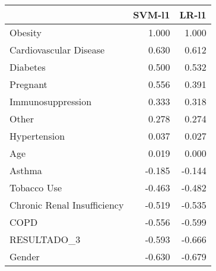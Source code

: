 \begin{tabular}{lrr}
\toprule
{} &  SVM-l1 &  LR-l1 \\
\midrule
Obesity                     &   1.000 &  1.000 \\
Cardiovascular Disease      &   0.630 &  0.612 \\
Diabetes                    &   0.500 &  0.532 \\
Pregnant                    &   0.556 &  0.391 \\
Immunosuppression           &   0.333 &  0.318 \\
Other                       &   0.278 &  0.274 \\
Hypertension                &   0.037 &  0.027 \\
Age                         &   0.019 &  0.000 \\
Asthma                      &  -0.185 & -0.144 \\
Tobacco Use                 &  -0.463 & -0.482 \\
Chronic Renal Insufficiency &  -0.519 & -0.535 \\
COPD                        &  -0.556 & -0.599 \\
RESULTADO\_3                 &  -0.593 & -0.666 \\
Gender                      &  -0.630 & -0.679 \\
\bottomrule
\end{tabular}
